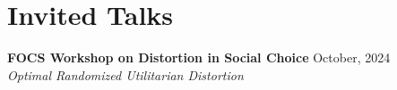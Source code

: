\documentclass{article}
\begin{document}
%
%    
%    
    
\section{Invited Talks}

\textbf{FOCS Workshop on Distortion in Social Choice} \hfill October, 2024 \\
\textit{Optimal Randomized Utilitarian Distortion}
\end{document}
